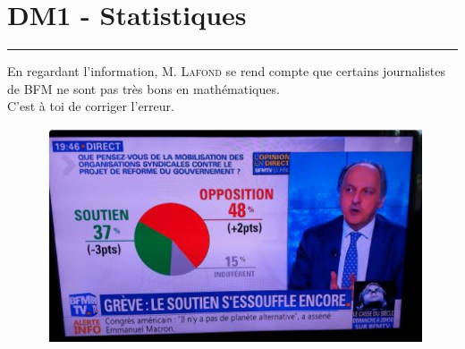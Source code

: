 \documentclass[12pt]{article}
\newcommand{\horrule}[1]{\rule{\linewidth}{#1}} %
\begin{document}

\newtheorem{Definition}{Définition}
\newtheorem{Theorem}{Théorème}
\newtheorem{Proposition}{Propriété}

\renewcommand{\labelitemi}{$\bullet$}
\renewcommand{\labelitemii}{$\circ$}

\setlength{\columnseprule}{0pt}

\section*{DM1 - Statistiques}
\horrule{2px}


\begin{multicols}{2}
En regardant l'information, \textsc{M. Lafond} se rend compte que certains journalistes de \textsc{BFM} ne sont pas très bons en mathématiques.\\
C'est à toi de corriger l'erreur. 

\begin{figure}[H]
	\centering
	\includegraphics[width=\linewidth]{3x1-statistiques/sources/bfm.jpg}
\end{figure}

\end{multicols}
\end{document}
